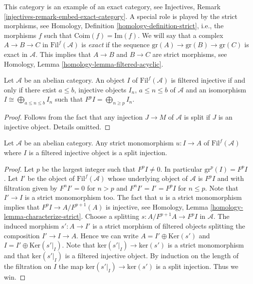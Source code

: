 \noindent
This category is an example of an exact category, see
Injectives, Remark \ref{injectives-remark-embed-exact-category}.
A special role is played by the strict morphisms, see
Homology, Definition \ref{homology-definition-strict},
i.e., the morphisms $f$ such that $\text{Coim}(f) = \text{Im}(f)$.
We will say that a complex $A \to B \to C$ in $\text{Fil}^f(\mathcal{A})$ is
{\it exact} if the sequence $\text{gr}(A) \to \text{gr}(B) \to \text{gr}(C)$
is exact in $\mathcal{A}$. This implies that $A \to B$ and $B \to C$
are strict morphisms, see
Homology, Lemma \ref{homology-lemma-filtered-acyclic}.

\begin{lemma}
\label{lemma-filtered-injective}
Let $\mathcal{A}$ be an abelian category.
An object $I$ of $\text{Fil}^f(\mathcal{A})$ is filtered injective
if and only if
there exist $a \leq b$, injective objects $I_n$, $a \leq n \leq b$
of $\mathcal{A}$ and an isomorphism $I \cong \bigoplus_{a \leq n \leq b} I_n$
such that $F^pI = \bigoplus_{n \geq p} I_n$.
\end{lemma}

\begin{proof}
Follows from the fact that any injection $J \to M$ of $\mathcal{A}$
is split if $J$ is an injective object. Details omitted.
\end{proof}

\begin{lemma}
\label{lemma-split-strict-monomorphism}
Let $\mathcal{A}$ be an abelian category.
Any strict monomorphism $u : I \to A$ of $\text{Fil}^f(\mathcal{A})$
where $I$ is a filtered injective object is a split injection.
\end{lemma}

\begin{proof}
Let $p$ be the largest integer such that $F^pI \not = 0$.
In particular $\text{gr}^p(I) = F^pI$.
Let $I'$ be the object of $\text{Fil}^f(\mathcal{A})$ whose
underlying object of $\mathcal{A}$ is $F^pI$ and with filtration
given by $F^nI' = 0$ for $n > p$ and $F^nI' = I' = F^pI$ for
$n \leq p$. Note that $I' \to I$ is a strict monomorphism too.
The fact that $u$ is a strict monomorphism implies that
$F^pI \to A/F^{p + 1}(A)$ is injective, see
Homology, Lemma \ref{homology-lemma-characterize-strict}.
Choose a splitting $s : A/F^{p + 1}A \to F^pI$ in $\mathcal{A}$.
The induced morphism $s' : A \to I'$ is a strict morphism of
filtered objects splitting the composition $I' \to I \to A$.
Hence we can write $A = I' \oplus \text{Ker}(s')$ and
$I = I' \oplus \text{Ker}(s'|_I)$. Note that
$\text{ker}(s'|_I) \to \text{ker}(s')$ is a strict monomorphism
and that $\text{ker}(s'|_I)$ is a filtered injective object.
By induction on the length of the filtration on $I$ the map
$\text{ker}(s'|_I) \to \text{ker}(s')$ is a split injection.
Thus we win.
\end{proof}


